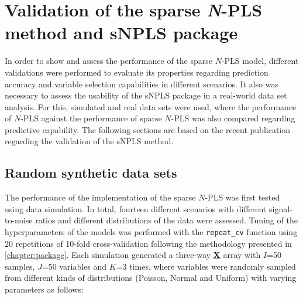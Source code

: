 
\chapter[Validation of the sparse \textit{N}-PLS method and sNPLS package]{Validation of the sparse \textit{N}-PLS method and sNPLS package}
\label{chapter:validation}
In order to show and assess the performance of the sparse $N$-PLS model, different validations were performed to evaluate its properties regarding prediction accuracy and variable selection capabilities in different scenarios. It also was necessary to assess the usability of the sNPLS package in a real-world data set analysis. For this, simulated and real data sets were used, where the performance of $N$-PLS against the performance of sparse $N$-PLS was also compared regarding predictive capability. The following sections are based on the recent publication \parencite{hervas2018snpls} regarding the validation of the sNPLS method.


\section{Random synthetic data sets}
The performance of the implementation of the sparse $N$-PLS was first tested using data simulation. In total, fourteen different scenarios with different signal-to-noise ratios and different distributions of the data were assessed. Tuning of the hyperparameters of the models was performed with the \texttt{repeat\_cv} function using 20 repetitions of 10-fold cross-validation following the methodology presented in \autoref{chapter:package}. Each simulation generated a three-way \textbf{\underline{X}} array with $I$=50 samples, $J$=50 variables and $K$=3 times, where variables were randomly sampled from different kinds of distributions (Poisson, Normal and Uniform) with varying parameters as follows:

